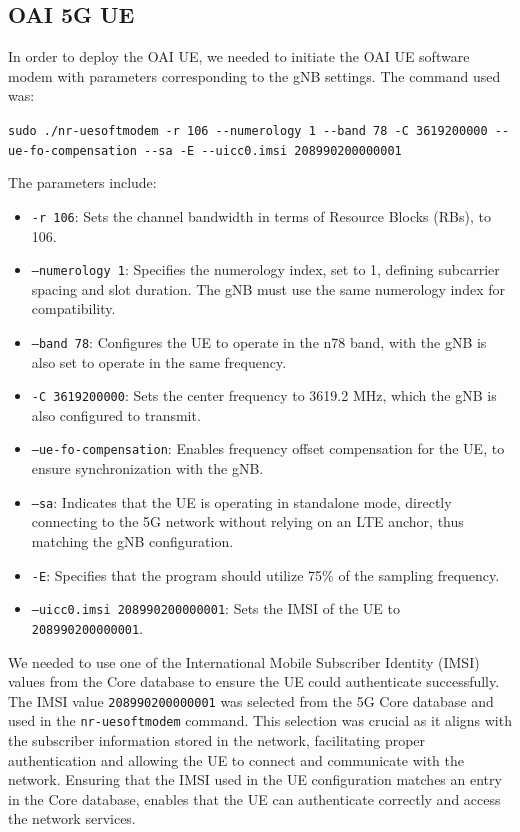 \subsection{OAI 5G UE}\label{subsec:oai-5g-ue}
In order to deploy the OAI UE, we needed to initiate the OAI UE software modem with parameters corresponding to the gNB settings.
The command used was:

\lstinline[columns=flexible,breaklines=true]{sudo ./nr-uesoftmodem -r 106 --numerology 1 --band 78 -C 3619200000 --ue-fo-compensation --sa -E --uicc0.imsi 208990200000001}


The parameters include:

\begin{itemize}
    \item \texttt{-r 106}: Sets the channel bandwidth in terms of Resource Blocks (RBs), to 106.
    \item \texttt{--numerology 1}: Specifies the numerology index, set to 1, defining subcarrier spacing and slot duration.
    The gNB must use the same numerology index for compatibility.
    \item \texttt{--band 78}: Configures the UE to operate in the n78 band, with the gNB is also set to operate in the same frequency.
    \item \texttt{-C 3619200000}: Sets the center frequency to 3619.2 MHz, which the gNB is also configured to transmit.
    \item \texttt{--ue-fo-compensation}: Enables frequency offset compensation for the UE, to ensure synchronization with the gNB\@.
    \item \texttt{--sa}: Indicates that the UE is operating in standalone mode, directly connecting to the 5G network without relying on an LTE anchor, thus matching the gNB configuration.
    \item \texttt{-E}: Specifies that the program should utilize 75\% of the sampling frequency.
    \item \texttt{--uicc0.imsi 208990200000001}: Sets the IMSI of the UE to \texttt{208990200000001}.
\end{itemize}

We needed to use one of the International Mobile Subscriber Identity (IMSI) values from the Core database to ensure the UE could authenticate successfully.
The IMSI value \texttt{208990200000001} was selected from the 5G Core database and used in the \texttt{nr-uesoftmodem} command.
This selection was crucial as it aligns with the subscriber information stored in the network, facilitating proper authentication and allowing the UE to connect and communicate with the network.
Ensuring that the IMSI used in the UE configuration matches an entry in the Core database, enables that the UE can authenticate correctly and access the network services.

